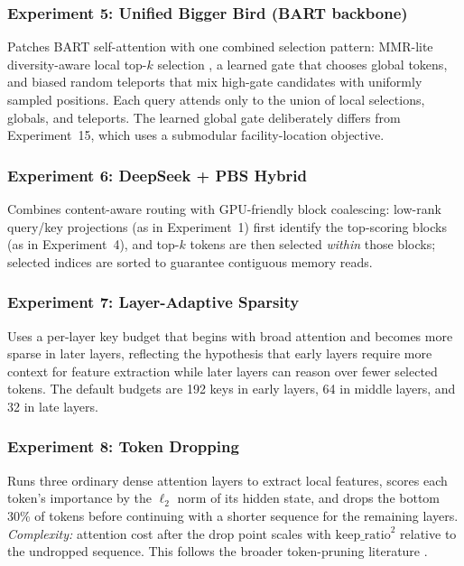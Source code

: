 \documentclass[11pt]{article}
\begin{document}
\subsubsection*{Experiment 5: Unified Bigger Bird (BART backbone)}
\label{exp:unified-bb}
Patches BART self-attention with one combined selection pattern: MMR-lite
diversity-aware local top-$k$ selection \citep{carbonell1998mmr}, a learned
gate that chooses global tokens, and biased random teleports that mix
high-gate candidates with uniformly sampled positions. Each query attends
only to the union of local selections, globals, and teleports. The learned
global gate deliberately differs from Experiment~15, which uses a submodular
facility-location objective.

\subsubsection*{Experiment 6: DeepSeek + PBS Hybrid}
\label{exp:deepseekpbs}
Combines content-aware routing with GPU-friendly block coalescing: low-rank
query/key projections (as in Experiment~1) first identify the top-scoring
blocks (as in Experiment~4), and top-$k$ tokens are then selected \emph{within}
those blocks; selected indices are sorted to guarantee contiguous memory
reads.

\subsubsection*{Experiment 7: Layer-Adaptive Sparsity}
\label{exp:layer-adaptive}
Uses a per-layer key budget that begins with broad attention and becomes more
sparse in later layers, reflecting the hypothesis that early layers require
more context for feature extraction while later layers can reason over fewer
selected tokens. The default budgets are 192 keys in early layers, 64 in
middle layers, and 32 in late layers.

\subsubsection*{Experiment 8: Token Dropping}
\label{exp:token-drop}
Runs three ordinary dense attention layers to extract local features, scores
each token's importance by the $\ell_2$ norm of its hidden state, and drops
the bottom 30\% of tokens before continuing with a shorter sequence for the
remaining layers. \emph{Complexity:} attention cost after the drop point
scales with $\mathrm{keep\_ratio}^2$ relative to the undropped sequence. This
follows the broader token-pruning literature \citep{goyal2020powerbert,kim2021tokenpruning}.
\end{document}

